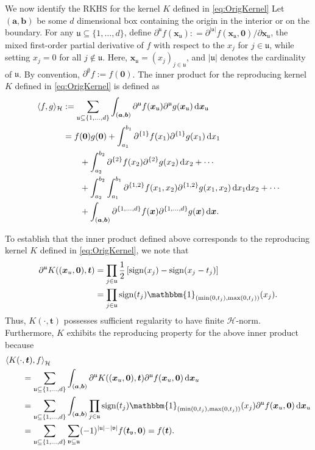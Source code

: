 \documentclass[graybox]{svmult}
\newcommand{\va}{\boldsymbol{a}}
\newcommand{\vb}{\boldsymbol{b}}
\newcommand{\vx}{\boldsymbol{x}}
\newcommand{\vt}{\boldsymbol{t}}
\newcommand{\fraku}{\mathfrak{u}}
\newcommand{\frakv}{\mathfrak{v}}
\newcommand{\vzero}{\boldsymbol{0}}
\newcommand{\dif}{{\rm d}}
\DeclareMathOperator{\sign}{sign}
\newcommand{\ch}{\mathcal{H}}
\newcommand{\bbone}{\mathbbm{1}}
\begin{document}
We now identify the RKHS for the kernel $K$ defined in \eqref{eq:OrigKernel} Let $(\va,\vb)$ be some $d$ dimensional box containing the origin in the interior or on the boundary. For any $\fraku \subseteq \{1, \ldots, d\}$, define $\partial^\fraku f(\vx_\fraku) : = \partial^{|\fraku|}f(\vx_\fraku,\vzero)/\partial \vx_\fraku$, the mixed first-order partial derivative of $f$ with respect to the $x_j$ for $j\in \fraku$, while setting $x_j=0$ for all $j \notin \fraku$. Here, $\vx_{\fraku} = (x_j)_{j \in \fraku}$, and $|\fraku|$ denotes the cardinality of $\fraku$.  By convention, $\partial^{\emptyset}f := f(\vzero)$.  The inner product for the reproducing kernel $K$ defined in  \eqref{eq:OrigKernel} is defined as 
\begin{align}
\label{eq:inner}
\langle f,g \rangle_{\ch} &:= \sum_{\fraku\subseteq \{1,...,d\}}\int_{(\va,\vb)}\partial^{\fraku}f(\vx_\fraku)\partial^{\fraku}g(\vx_\fraku) \, \dif \vx_\fraku \\
\nonumber
& = f(\vzero)g(\vzero)  + \int_{a_1}^{b_1} \partial^{\{1\}}f(x_1)\partial^{\{1\}}g(x_1) \, \dif x_1 \\
\nonumber 
& \qquad + \int_{a_2}^{b_2} \partial^{\{2\}}f(x_2)\partial^{\{2\}}g(x_2) \, \dif x_2 + \cdots \\
\nonumber 
& \qquad + \int_{a_2}^{b_2} \int_{a_1}^{b_1} \partial^{\{1,2\}}f(x_1,x_2)\partial^{\{1,2\}}g(x_1,x_2) \, \dif x_1 \dif x_2+ \cdots \\
\nonumber 
& \qquad + \int_{(\va,\vb)} \partial^{\{1,\ldots, d\}}f(\vx)\partial^{\{1, \ldots, d\}}g(\vx) \, \dif \vx. 
\end{align}

To establish that the inner product defined above corresponds to the reproducing kernel  $K$ defined in \eqref{eq:OrigKernel}, we note that
\begin{align*}
\partial^{\fraku} K((\vx_u,{\bf 0}),\vt) & =\prod_{j \in \fraku}\frac 12 \left[\sign(x_j) - \sign(x_j - t_j) \right] \\
& =
\prod\limits_{j \in \fraku}\sign(t_j) \bbone_{(\min(0,t_j),\max(0,t_j))}(x_j).
\end{align*}
Thus, $K(\cdot,\vt)$ possesses sufficient regularity to have finite $\ch$-norm.  Furthermore, $K$ exhibits the reproducing property for the above inner product because
\begin{align*}
\MoveEqLeft{\langle K(\cdot,\vt),f \rangle}_{\ch} \\
&= \sum_{\fraku\subseteq \{1,...,d\}}\int_{(\va,\vb)} \partial^{\fraku}K((\vx_u,{\bf 0}),\vt)\partial^{\fraku}f(\vx_u,{\bf 0})  \, \dif \vx_u \\
&= \sum_{\fraku\subseteq \{1,...,d\}}\int_{(\va,\vb)}  \prod\limits_{j \in \fraku}\sign(t_j) \bbone_{(\min(0,t_j),\max(0,t_j))}(x_j) \partial^{\fraku}f(\vx_u,{\bf 0})  \, \dif \vx_u \\
& =     \sum_{\fraku\subseteq \{1,...,d\}}\sum_{\frakv\subseteq \fraku}(-1)^{|\fraku|-|\frakv|}f(\vt_\frakv,{\bf 0})= f(\vt).
\end{align*}
\end{document}
